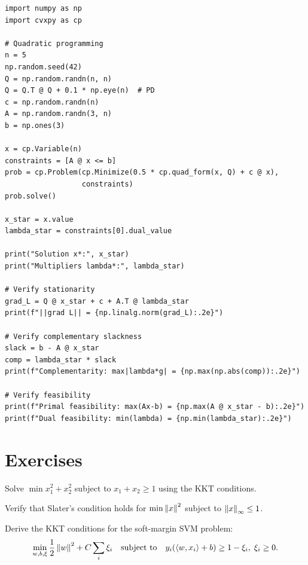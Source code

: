 \begin{codeblock}[title=\textbf{Verifying KKT conditions with CVXPY}]
\begin{verbatim}
import numpy as np
import cvxpy as cp

# Quadratic programming
n = 5
np.random.seed(42)
Q = np.random.randn(n, n)
Q = Q.T @ Q + 0.1 * np.eye(n)  # PD
c = np.random.randn(n)
A = np.random.randn(3, n)
b = np.ones(3)

x = cp.Variable(n)
constraints = [A @ x <= b]
prob = cp.Problem(cp.Minimize(0.5 * cp.quad_form(x, Q) + c @ x),
                  constraints)
prob.solve()

x_star = x.value
lambda_star = constraints[0].dual_value

print("Solution x*:", x_star)
print("Multipliers lambda*:", lambda_star)

# Verify stationarity
grad_L = Q @ x_star + c + A.T @ lambda_star
print(f"||grad L|| = {np.linalg.norm(grad_L):.2e}")

# Verify complementary slackness
slack = b - A @ x_star
comp = lambda_star * slack
print(f"Complementarity: max|lambda*g| = {np.max(np.abs(comp)):.2e}")

# Verify feasibility
print(f"Primal feasibility: max(Ax-b) = {np.max(A @ x_star - b):.2e}")
print(f"Dual feasibility: min(lambda) = {np.min(lambda_star):.2e}")
\end{verbatim}
\end{codeblock}

\section{Exercises}

\begin{exercise}[$\star$]
Solve $\min x_1^2 + x_2^2$ subject to $x_1 + x_2 \geq 1$ using the KKT conditions.
\end{exercise}

\begin{exercise}[$\star$]
Verify that Slater's condition holds for
$\min \left\| x \right\|^2$ subject to $\left\| x \right\|_\infty \leq 1$.
\end{exercise}

\begin{exercise}[$\star\star$]
Derive the KKT conditions for the soft-margin SVM problem:
\[
    \min_{w,b,\xi} \frac{1}{2}\left\| w \right\|^2 + C\sum_i \xi_i \quad \text{subject to} \quad
    y_i(\langle w, x_i \rangle + b) \geq 1 - \xi_i, \; \xi_i \geq 0.
\]
\end{exercise}

